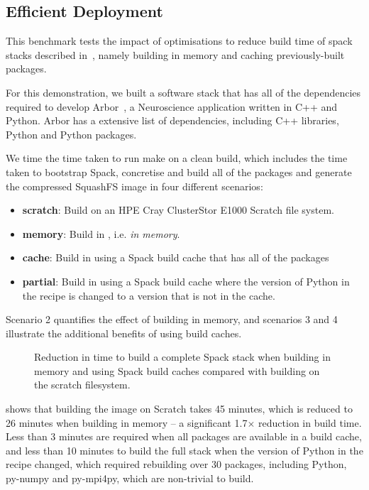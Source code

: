 \subsection{Efficient Deployment}

This benchmark tests the impact of optimisations to reduce build time of spack stacks described in~, namely building in memory and caching previously-built packages.

For this demonstration, we built a software stack that has all of the dependencies required to develop Arbor~\cite{paper:arbor2019,software:arbor}, a Neuroscience application written in C++ and Python.
Arbor has a extensive list of dependencies, including C++ libraries, Python and Python packages.

We time the time taken to run make on a clean build, which includes the time taken to bootstrap Spack, concretise and build all of the packages and generate the compressed SquashFS image in four different scenarios:
\begin{itemize}
    \item \textbf{scratch}: Build on an HPE Cray ClusterStor E1000 Scratch file system.
    \item \textbf{memory}: Build in , i.e. \emph{in memory}.
    \item \textbf{cache}: Build in  using a Spack build cache that has all of the packages 
    \item \textbf{partial}: Build in  using a Spack build cache where the version of Python in the recipe is changed to a version that is not in the cache.
\end{itemize}
Scenario 2 quantifies the effect of building in memory, and scenarios 3 and 4 illustrate the additional benefits of using build caches.

\begin{figure}[htp!]
    \begin{center}
        
    \end{center}
    \caption{Reduction in time to build a complete Spack stack when building in memory and using Spack build caches compared with building on the scratch filesystem.}
    \label{fig:image-build}
\end{figure}

 shows that building the image on Scratch takes 45 minutes, which is reduced to 26 minutes when building in memory -- a significant 1.7$\times$ reduction in build time.
Less than 3 minutes are required when all packages are available in a build cache, and less than 10 minutes to build the full stack when the version of Python in the recipe changed, which required rebuilding over 30 packages, including Python, py-numpy and py-mpi4py, which are non-trivial to build.

